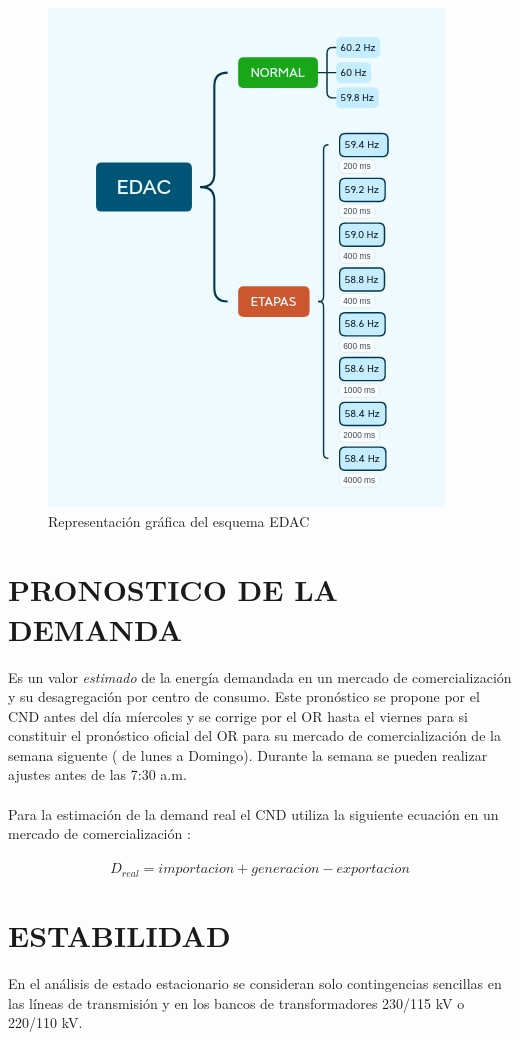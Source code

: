 \documentclass[a5paper]{book}%
\begin{document}
\begin{figure}[H]
  \centering
  \caption{Representación gráfica del esquema EDAC}
  \label{fig:edac2}
  \includegraphics[width=0.8\linewidth]{EDAC}
\end{figure}

\chapter{PRONOSTICO DE LA DEMANDA}

Es un valor \textit{estimado} de la energía demandada en un mercado de
comercialización y su desagregación por centro de consumo. Este
pronóstico se propone por el CND antes del día míercoles y se corrige
por el OR hasta el viernes para si constituir el pronóstico oficial
del OR para su mercado de comercialización de la semana siguente ( de
lunes a Domingo). Durante la semana se pueden realizar ajustes antes
de las 7:30 a.m.\\\\
Para la estimación de la demand real el CND utiliza la siguiente
ecuación en un mercado de comercialización :\\\\
\[D_{real} = importacion + generacion - exportacion \]

\chapter{ESTABILIDAD}
 En el análisis de estado estacionario se consideran solo
  contingencias sencillas en las líneas de transmisión y en los bancos
  de transformadores 230/115 kV o 220/110 kV.\\\\
	
\end{document}

